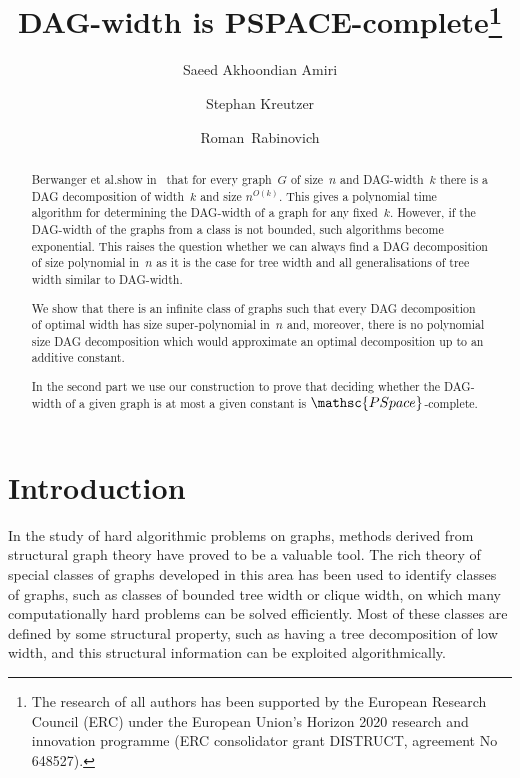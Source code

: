 \documentclass[authoryear]{article}
\theoremstyle{definition}
\newcommand{\0}{\emptyset}
\newcommand{\pspace}{\ensuremath{\mathsc{PSpace}}\xspace}
\newcommand{\tw}{tree {}width\xspace}
\newcommand{\dagw}{DAG-{}width\xspace}
\begin{document}
  \title{DAG-width is PSPACE-complete\thanks{The research of all authors has
    been supported by the European Research Council (ERC) under the European Union’s Horizon 2020 research and
    innovation programme (ERC consolidator grant DISTRUCT, agreement No 648527).}}
  \author[ ]{Saeed Akhoondian Amiri}
  \author[ ]{Stephan Kreutzer}
  \author[ ]{Roman~Rabinovich}
  \date{}

\maketitle
  
\begin{abstract}

  Berwanger et al.\@ show in~\cite{BerwangerDawHunKreObd12} that for
  every graph~$G$ of size~$n$ and \dagw~$k$ there is a DAG
  decomposition of width~$k$ and size $n^{O(k)}$. This gives a
  polynomial time algorithm for determining the \dagw of a graph for
  any fixed~$k$. However, if the \dagw of the graphs from a class is
  not bounded, such algorithms become exponential. This raises the
  question whether we can always find a DAG decomposition of size
  polynomial in~$n$ as it is the case for \tw and all generalisations
  of \tw similar to \dagw.

  We show that  there is an infinite class of graphs such that every DAG
  decomposition of optimal width has size super-polynomial in~$n$ and,
  moreover, there is no polynomial size DAG decomposition 
  which would approximate an optimal decomposition up to
  an additive constant.

  In the second part we use our construction to prove that deciding
  whether the DAG-width of a given graph is at most a given constant
  is \pspace-complete.


\end{abstract}

 


\section{Introduction}

In the study of hard algorithmic problems on graphs,
methods derived from structural graph theory have proved to be a
valuable tool. The rich theory of special classes of graphs developed
in this area has been used to identify classes of graphs, such as
classes of bounded tree width or clique width,
on which many computationally hard problems can be solved
efficiently. 
Most of these classes are defined by some structural
property, such as having a tree decomposition of low width, and this structural 
information can be exploited
algorithmically. 
\end{document}
